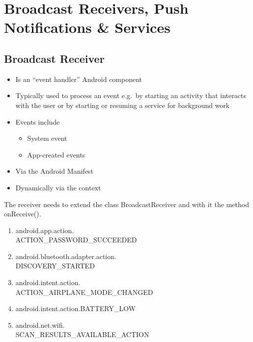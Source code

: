 \section{Broadcast Receivers, Push Notifications \& Services}
\subsection{Broadcast Receiver}

\begin{breakbox}
\begin{itemize}
\tightlist
\item
  Is an ``event handler'' Android component
\item
  Typically used to process an event e.g.~by starting an activity that
  interacts with the user or by starting or resuming a service for
  background work
\item
  Events include

  \begin{itemize}
  \tightlist
  \item
    System event
  \item
    App-created events
  \end{itemize}
\end{itemize}
\end{breakbox}

\begin{breakbox}

\begin{itemize}
\tightlist
\item
  Via the Android Manifest
\item
  Dynamically via the context
\end{itemize}
\end{breakbox}

\begin{breakbox}

The receiver needs to extend the class BroadcastReceiver and with
it the method onReceive().

\end{breakbox}

\begin{breakbox}

\begin{enumerate}
\item
  android.app.action.\\
  ACTION\_PASSWORD\_SUCCEEDED
\item
  android.bluetooth.adapter.action.\\
  DISCOVERY\_STARTED
\item
  android.intent.action.\\
  ACTION\_AIRPLANE\_MODE\_CHANGED
\item
  android.intent.action.BATTERY\_LOW
\item
  android.net.wifi.\\
  SCAN\_RESULTS\_AVAILABLE\_ACTION
\end{enumerate}
\end{breakbox}

